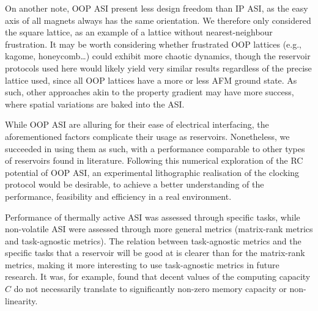 On another note, OOP ASI present less design freedom than IP ASI, as the easy axis of all magnets always has the same orientation.
We therefore only considered the square lattice, as an example of a lattice without nearest-neighbour frustration.
It may be worth considering whether frustrated OOP lattices (e.g., kagome, honeycomb\dots) could exhibit more chaotic dynamics, though the reservoir protocols used here would likely yield very similar results regardless of the precise lattice used, since all OOP lattices have a more or less AFM ground state.
As such, other approaches akin to the property gradient may have more success, where spatial variations are baked into the ASI. \\\par

While OOP ASI are alluring for their ease of electrical interfacing, the aforementioned factors complicate their usage as reservoirs.
Nonetheless, we succeeded in using them as such, with a performance comparable to other types of reservoirs found in literature.
Following this numerical exploration of the RC potential of OOP ASI, an experimental lithographic realisation of the clocking protocol would be desirable, to achieve a better understanding of the performance, feasibility and efficiency in a real environment.



Performance of thermally active ASI was assessed through specific tasks, while non-volatile ASI were assessed through more general metrics (matrix-rank metrics and task-agnostic metrics).
The relation between task-agnostic metrics and the specific tasks that a reservoir will be good at is clearer than for the matrix-rank metrics, making it more interesting to use task-agnostic metrics in future research.
It was, for example, found that decent values of the computing capacity $C$ do not necessarily translate to significantly non-zero memory capacity or non-linearity.



